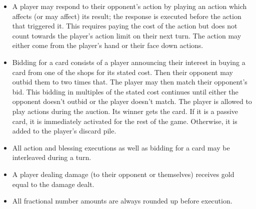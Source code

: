 \documentclass[dvipsnames,parskip,a4paper]{scrartcl}
\begin{document}
\begin{itemize}
\item

A player may respond to their opponent's action by playing an action which affects (or may affect) its result; the response is executed before the action that triggered it. This requires paying the cost of the action but does not count towards the player's action limit on their next turn. The action may either come from the player's hand or their face down actions.

\item

Bidding for a card consists of a player announcing their interest in buying a card from one of the shops for its stated cost. Then their opponent may outbid them to two times that. The player may then match their opponent's bid. This bidding in multiples of the stated cost continues until either the opponent doesn't outbid or the player doesn't match. The player is allowed to play actions during the auction. Its winner gets the card. If it is a passive card, it is immediately activated for the rest of the game. Otherwise, it is added to the player's discard pile.

\item

All action and blessing executions as well as bidding for a card may be interleaved during a turn.

\item

A player dealing damage (to their opponent or themselves) receives gold equal to the damage dealt.

\item

All fractional number amounts are always rounded up before execution.

\end{itemize}

\newpage
\end{document}

